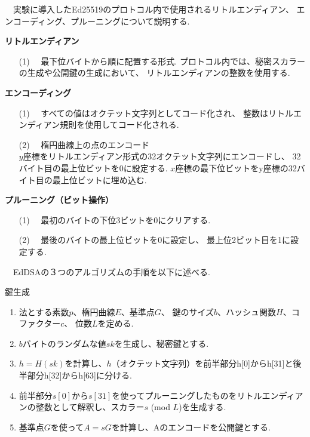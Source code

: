 　実験に導入したEd25519のプロトコル内で使用されるリトルエンディアン、
エンコーディング、プルーニングについて説明する.\\
\begin{mdframed}[linecolor=black,roundcorner=10pt]
  \textbf{リトルエンディアン}
  \begin{enumerate}
    \item[(1)] 　最下位バイトから順に配置する形式.
    プロトコル内では、秘密スカラーの生成や公開鍵の生成において、
    リトルエンディアンの整数を使用する.
  \end{enumerate}
  \textbf{エンコーディング}
  \begin{enumerate}
    \item[(1)]　すべての値はオクテット文字列としてコード化され、
    整数はリトルエンディアン規則を使用してコード化される.
    \item[(2)]　楕円曲線上の点のエンコード\\
    $y$座標をリトルエンディアン形式の32オクテット文字列にエンコードし、
    32バイト目の最上位ビットを0に設定する.
    $x$座標の最下位ビットをy座標の32バイト目の最上位ビットに埋め込む.
  \end{enumerate}
  \textbf{プルーニング（ビット操作）}
  \begin{enumerate}
    \item [(1)]　最初のバイトの下位3ビットを0にクリアする.
    \item [(2)]　最後のバイトの最上位ビットを0に設定し、
                 最上位2ビット目を1に設定する.
  \end{enumerate}
\end{mdframed}
\vspace{2em}

　EdDSAの３つのアルゴリズムの手順を以下に述べる.

\begin{itembox}[l]{鍵生成}
  \begin{enumerate}[parsep=7pt]
    \item 法とする素数$p$、楕円曲線$E$、基準点$G$、
                  鍵のサイズ$b$、ハッシュ関数$H$、コファクター$c$、
                  位数$L$を定める.
    \item $b$バイトのランダムな値$sk$を生成し、秘密鍵とする.
    \item $h = H(sk)$を計算し、$h$（オクテット文字列）を前半部分h[0]からh[31]と後半部分h[32]からh[63]に分ける.
    \item 前半部分$s[0]$から$s[31]$を使ってプルーニングしたものをリトルエンディアンの整数として解釈し、スカラー$s$ (mod $L$)を生成する.
    \item 基準点$G$を使って$A = sG$を計算し、Aのエンコードを公開鍵とする.
  \end{enumerate}
\end{itembox}
  
